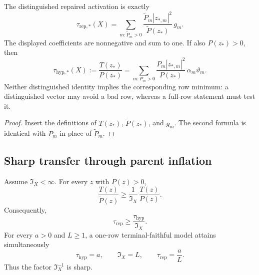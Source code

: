 \begin{theorem}
\label{thm:tpc64-distinguished-activation-average}
The distinguished repaired activation is exactly
\begin{equation}
 \boxed{
 \tau_{\mathrm{rep},*}(X)
 =
 \sum_{m:\widetilde P_m>0}
 \frac{\widetilde P_m|z_{*,m}|^2}
      {\widetilde P(z_*)}\,
 g_m.}
 \label{eq:tpc64-distinguished-activation-average}
\end{equation}
The displayed coefficients are nonnegative and sum to one.  If also
\(P(z_*)>0\), then
\begin{equation}
 \tau_{\mathrm{hyp},*}(X)
 :=\frac{T(z_*)}{P(z_*)}
 =
 \sum_{m:P_m>0}
 \frac{P_m|z_{*,m}|^2}{P(z_*)}\,
 \alpha_m\vartheta_m.
 \label{eq:tpc64-distinguished-hypergraph-average}
\end{equation}
Neither distinguished identity implies the corresponding row minimum:
a distinguished vector may avoid a bad row, whereas a full-row statement
must test it.
\end{theorem}

\begin{proof}
Insert the definitions of \(T(z_*)\), \(\widetilde P(z_*)\), and \(g_m\).
The second formula is identical with \(P_m\) in place of
\(\widetilde P_m\).
\end{proof}

\subsection{Sharp transfer through parent inflation}

\begin{theorem}
\label{thm:tpc64-inflation-corrected-activation}
Assume \(\mathfrak I_X<\infty\).  For every \(z\) with \(P(z)>0\),
\begin{equation}
 \boxed{
 \frac{T(z)}{\widetilde P(z)}
 \ge
 \frac1{\mathfrak I_X}\,
 \frac{T(z)}{P(z)}.}
 \label{eq:tpc64-pointwise-inflation-transfer}
\end{equation}
Consequently,
\begin{equation}
 \boxed{
 \tau_{\mathrm{rep}}
 \ge\frac{\tau_{\mathrm{hyp}}}{\mathfrak I_X}.}
 \label{eq:tpc64-uniform-inflation-transfer}
\end{equation}
For every \(a>0\) and \(L\ge1\), a one-row terminal-faithful model attains
simultaneously
\begin{equation}
 \tau_{\mathrm{hyp}}=a,\qquad
 \mathfrak I_X=L,\qquad
 \tau_{\mathrm{rep}}=\frac aL.
 \label{eq:tpc64-inflation-transfer-sharp-model}
\end{equation}
Thus the factor \(\mathfrak I_X^{-1}\) is sharp.
\end{theorem}

